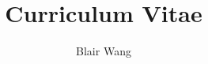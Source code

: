 \documentclass[hidelinks,12pt]{article}
\begin{document}
\title{Curriculum Vitae}
\author{Blair Wang}
\maketitle

\raggedright






\end{document}
